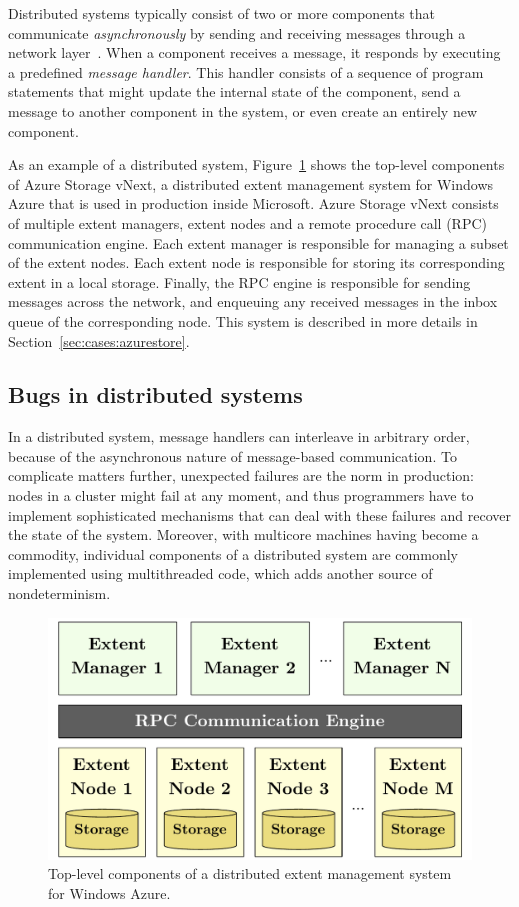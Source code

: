 Distributed systems typically consist of two or more components that communicate \emph{asynchronously} by sending and receiving messages through a network layer~\cite{lamport1978time}. When a component receives a message, it responds by executing a predefined \emph{message handler}. This handler consists of a sequence of program statements that might update the internal state of the component, send a message to another component in the system, or even create an entirely new component.

As an example of a distributed system, Figure~\ref{fig:azurestore} shows the top-level components of Azure Storage vNext, a distributed extent management system for Windows Azure that is used in production inside Microsoft. Azure Storage vNext consists of multiple extent managers, extent nodes and a remote procedure call (RPC) communication engine. Each extent manager is responsible for managing a subset of the extent nodes. Each extent node is responsible for storing its corresponding extent in a local storage. Finally, the RPC engine is responsible for sending messages across the network, and enqueuing any received messages in the inbox queue of the corresponding node. This system is described in more details in Section~\ref{sec:cases:azurestore}.

\subsection{Bugs in distributed systems}
\label{sec:overview:bugs}

In a distributed system, message handlers can interleave in arbitrary order, because of the asynchronous nature of message-based communication. To complicate matters further, unexpected failures are the norm in production: nodes in a cluster might fail at any moment, and thus programmers have to implement sophisticated mechanisms that can deal with these failures and recover the state of the system. Moreover, with multicore machines having become a commodity, individual components of a distributed system are commonly implemented using multithreaded code, which adds another source of nondeterminism.

\begin{figure}[t]
\centering
\includegraphics[width=\linewidth]{img/azurestore}
\caption{Top-level components of a distributed extent management system for Windows Azure.}
\label{fig:azurestore}
\end{figure}

